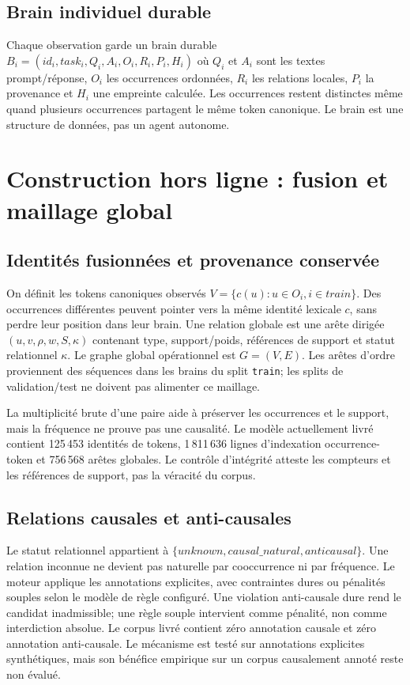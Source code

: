 \documentclass[11pt,a4paper,openany]{book}
\begin{document}
\section{Brain individuel durable}
Chaque observation garde un brain durable $B_i=(id_i,task_i,Q_i,A_i,O_i,R_i,P_i,H_i)$ où $Q_i$ et $A_i$ sont les textes prompt/réponse, $O_i$ les occurrences ordonnées, $R_i$ les relations locales, $P_i$ la provenance et $H_i$ une empreinte calculée. Les occurrences restent distinctes même quand plusieurs occurrences partagent le même token canonique. Le brain est une structure de données, pas un agent autonome.

\chapter{Construction hors ligne : fusion et maillage global}
\section{Identités fusionnées et provenance conservée}
On définit les tokens canoniques observés $V=\{c(u):u\in O_i, i\in train\}$. Des occurrences différentes peuvent pointer vers la même identité lexicale $c$, sans perdre leur position dans leur brain. Une relation globale est une arête dirigée $(u,v,\rho,w,S,\kappa)$ contenant type, support/poids, références de support et statut relationnel $\kappa$. Le graphe global opérationnel est $G=(V,E)$. Les arêtes d'ordre proviennent des séquences dans les brains du split \texttt{train}; les splits de validation/test ne doivent pas alimenter ce maillage.

La multiplicité brute d'une paire aide à préserver les occurrences et le support, mais la fréquence ne prouve pas une causalité. Le modèle actuellement livré contient 125\,453 identités de tokens, 1\,811\,636 lignes d'indexation occurrence-token et 756\,568 arêtes globales. Le contrôle d'intégrité atteste les compteurs et les références de support, pas la véracité du corpus.

\section{Relations causales et anti-causales}
Le statut relationnel appartient à $\{unknown,causal\_natural,anticausal\}$. Une relation inconnue ne devient pas naturelle par cooccurrence ni par fréquence. Le moteur applique les annotations explicites, avec contraintes dures ou pénalités souples selon le modèle de règle configuré. Une violation anti-causale dure rend le candidat inadmissible; une règle souple intervient comme pénalité, non comme interdiction absolue. Le corpus livré contient zéro annotation causale et zéro annotation anti-causale. Le mécanisme est testé sur annotations explicites synthétiques, mais son bénéfice empirique sur un corpus causalement annoté reste non évalué.
\end{document}
